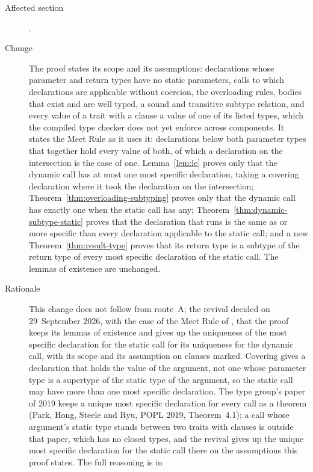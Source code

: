 \begin{description}
\item[Affected section] .
\item[Change] The proof states its scope and its assumptions: declarations
whose parameter and return types have no static parameters, calls to which
declarations are applicable without coercion, the overloading rules, bodies
that exist and are well typed, a sound and transitive subtype relation, and
every value of a trait with a  clause a value of one of its
listed types, which the compiled type checker does not yet enforce across
components.
It states the Meet Rule as it uses it: declarations below both parameter types
that together hold every value of both, of which a declaration on the
intersection is the case of one.
Lemma~\ref{lem:le} proves only that the dynamic call has at most one most
specific declaration, taking a covering declaration where it took the
declaration on the intersection;
Theorem~\ref{thm:overloading-subtyping} proves only that the dynamic call has
exactly one when the static call has any;
Theorem~\ref{thm:dynamic-subtype-static} proves that the declaration that runs
is the same as or more specific than every declaration applicable to the static
call; and a new Theorem~\ref{thm:result-type} proves that its return type is a
subtype of the return type of every most specific declaration of the static
call.
The lemmas of existence are unchanged.
\item[Rationale] This change does not follow from route~A; the revival decided
on 29~September 2026, with the case of the Meet Rule of ,
that the proof keeps its lemmas of existence and gives up the uniqueness of the
most specific declaration for the static call for its uniqueness for the
dynamic call, with its scope and its assumption on  clauses
marked.
Covering gives a declaration that holds the value of the argument, not one
whose parameter type is a supertype of the static type of the argument, so the
static call may have more than one most specific declaration.
The type group's paper of 2019 keeps a unique most specific declaration for
every call as a theorem (Park, Hong, Steele and Ryu, POPL 2019, Theorem~4.1);
a call whose argument's static type stands between two traits with
 clauses is outside that paper, which has no closed types, and
the revival gives up the unique most specific declaration for the static call
there on the assumptions this proof states.
The full reasoning is in

\end{description}
